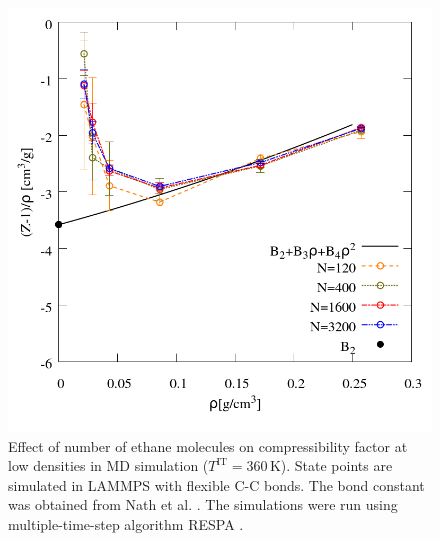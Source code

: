 \documentclass[5p,times]{elsarticle}
\begin{document}
\begin{figure}
\includegraphics[scale=0.3]{Figures/FSE_TraPPE-C2_Lammps-flex_IT.png}
\caption{Effect of number of ethane molecules on compressibility factor at low densities in MD simulation ($T^{\mathrm{IT}}=360 \, \mathrm{K}$). State points are simulated in LAMMPS with flexible C-C bonds. The bond constant was obtained from Nath et al.  \cite{Nath1998a}. The simulations were run using multiple-time-step algorithm RESPA \cite{tuckerman1992}. 
}
\label{fig:FSE_TraPPE_C2_Lammps_flex_IT}
\end{figure}
\end{document}

